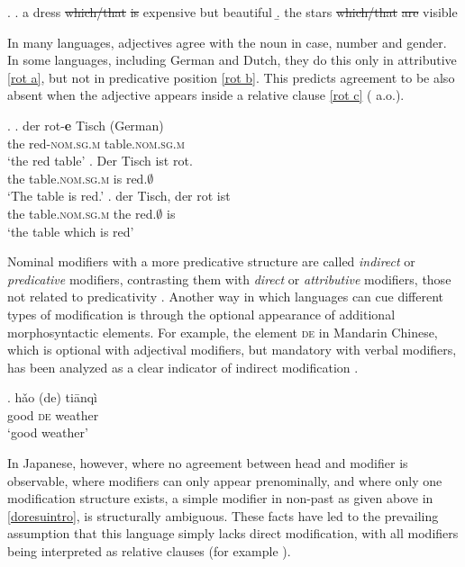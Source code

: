 \documentclass [output=book,colorlinks,citecolor=brown]{langscibook}
\begin{document}
\ex. \a. a dress \st{which/that} \st{is} expensive but beautiful
\b. the stars \st{which/that} \st{are} visible

In many languages, adjectives agree with the noun in case, number and gender. In some languages, including German and Dutch, they do this only in attributive \ref{rot a}, but not in predicative position \ref{rot b}. This predicts agreement to be also absent when the adjective appears inside a relative clause \ref{rot c} (\citealt{roehrs:2008:something, belk:2017:attributes, zeijlstra:2020:agree} a.o.).

\ex. \ag. der rot-\textbf{e} Tisch (German)\\
the red-\textsc{nom.sg.m} table.\textsc{nom.sg.m}\\
`the red table’ \label{rot a}
\bg. Der Tisch ist rot.\\
the table.\textsc{nom.sg.m} is red.$\emptyset$\\
`The table is red.’ \label{rot b}
\cg. der Tisch, der rot ist\\
the table.\textsc{nom.sg.m} the red.$\emptyset$ is\\
`the table which is red’ \label{rot c}

Nominal modifiers with a more predicative structure are called \textit{indirect} or \textit{predicative} modifiers, contrasting them with \textit{direct} or \textit{attributive} modifiers, those not related to predicativity \citep{sproat:1991:the, alex:2007:nounphrase, cinque:2010:adj}. Another way in which languages can cue different types of modification is through the optional appearance of additional morphosyntactic elements. For example, the element \textsc{de} in Mandarin Chinese, which is optional with adjectival modifiers, but mandatory with verbal modifiers, has been analyzed as a clear indicator of indirect modification \citep[571]{sproat:1991:the}.

\exg. h\v{a}o (de) tiānqì\\
good \textsc{de} weather\\
`good weather’ \null \hfill \citep[573]{sproat:1991:the}

In Japanese, however, where no agreement between head and modifier is observable, where modifiers can only appear prenominally, and where only one modification structure exists, a simple modifier in non-past as given above in \ref{doresuintro}, is structurally ambiguous. These facts have led to the prevailing assumption that this language simply lacks direct modification, with all modifiers being interpreted as relative clauses (for example \citealt{kuno:1973:structure, hinds:1988:japanese, whitman:1981:internal, kaplan:1995:the}).
\end{document}
